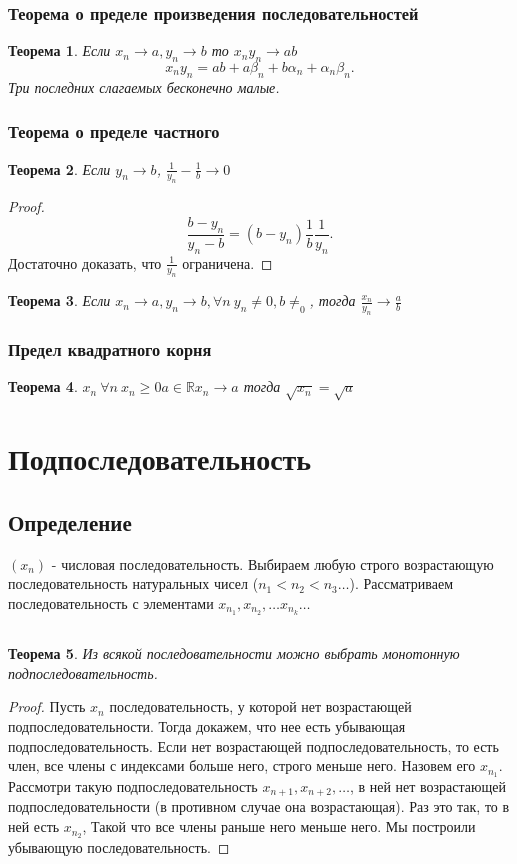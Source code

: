 \documentclass[a4paper]{scrartcl}
\newtheorem{theorem}{Теорема}
\begin{document}
\subsubsection{Теорема о пределе произведения последовательностей}
\begin{theorem}
	Если $x_n \to a, y_n \to b $ то $ x_n y_n \to ab$
	\[
		x_n y_n = ab + a\beta_n + b \alpha_n + \alpha_n \beta_n
		.\]
	Три последних слагаемых бесконечно малые.
\end{theorem}
\subsubsection{Теорема о пределе частного}
\begin{theorem}
	Если $y_n \to b$, $\frac{1}{y_n} - \frac{1}{b} \to 0$
\end{theorem}
\begin{proof}
	\[
		\frac{b - y_n}{y_n- b} = (b - y_n)  \frac{1}{b}\frac{1}{y_n}
		.\]
	Достаточно доказать, что $\frac{1}{y_n}$ ограничена.
\end{proof}
\begin{theorem}
	Если $x_n \to a, y_n \to b , \forall n ~ y_n \neq 0, b\neq_0$, тогда
	$\frac{x_n}{y_n} \to \frac{a}{b}$
\end{theorem}
\subsubsection{Предел квадратного корня}
\begin{theorem}
	$x_n ~\forall n ~x_n \ge 0  a \in \mathbb{R} x_n \to a$ тогда $\sqrt{x_n} = \sqrt{a}$
\end{theorem}
\section{Подпоследовательность}
\subsection{Определение}
$(x_n)$ - числовая последовательность. Выбираем любую строго возрастающую последовательность натуральных чисел ($n_1 < n_2  < n_3 \dots $). Рассматриваем последовательность с элементами $x_{n_1}, x_{n_2}, \dots x_{n_{k}} \dots$
\subsection{}
\begin{theorem} \label{1}
	Из всякой последовательности можно выбрать монотонную подпоследовательность.
\end{theorem}
\begin{proof}

	Пусть $x_n$ последовательность, у которой нет возрастающей подпоследовательности. Тогда
	докажем, что нее есть убывающая подпоследовательность. Если нет возрастающей подпоследовательность, то
	есть член, все члены с индексами больше него, строго меньше него. Назовем его $x_{n_1}$.
	Рассмотри такую подпоследовательность $x_{n +1} , x_{n + 2},\dots$, в ней нет возрастающей подпоследовательности (в противном случае она возрастающая). Раз это так, то в ней есть  $x_{n_2}$, Такой что все члены раньше него меньше него. Мы построили убывающую последовательность.
\end{proof}
\end{document}
